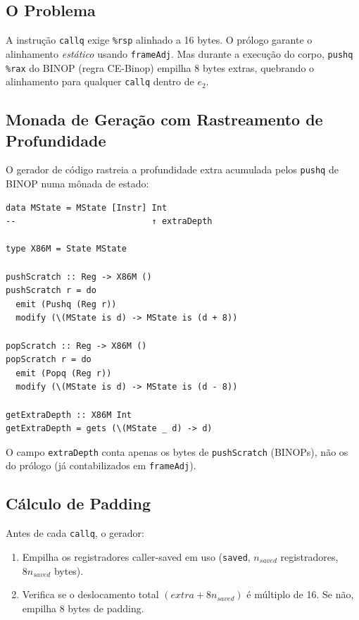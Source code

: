 \subsection{O Problema}

A instrução \texttt{callq} exige \texttt{\%rsp} alinhado a 16 bytes.
O prólogo garante o alinhamento \emph{estático} usando \texttt{frameAdj}.
Mas durante a execução do corpo, \texttt{pushq \%rax} do BINOP
(regra CE-Binop) empilha 8 bytes extras, quebrando o alinhamento para
qualquer \texttt{callq} dentro de $e_2$.

\subsection{Monada de Geração com Rastreamento de Profundidade}

O gerador de código rastreia a profundidade extra acumulada pelos
\texttt{pushq} de BINOP numa mônada de estado:

\begin{verbatim}
data MState = MState [Instr] Int
--                           ↑ extraDepth

type X86M = State MState

pushScratch :: Reg -> X86M ()
pushScratch r = do
  emit (Pushq (Reg r))
  modify (\(MState is d) -> MState is (d + 8))

popScratch :: Reg -> X86M ()
popScratch r = do
  emit (Popq (Reg r))
  modify (\(MState is d) -> MState is (d - 8))

getExtraDepth :: X86M Int
getExtraDepth = gets (\(MState _ d) -> d)
\end{verbatim}

O campo \texttt{extraDepth} conta apenas os bytes de \texttt{pushScratch}
(BINOPs), não os do prólogo (já contabilizados em \texttt{frameAdj}).

\subsection{Cálculo de Padding}

Antes de cada \texttt{callq}, o gerador:

\begin{enumerate}
  \item Empilha os registradores caller-saved em uso (\texttt{saved},
    $n_{\mathit{saved}}$ registradores, $8 n_{\mathit{saved}}$ bytes).
  \item Verifica se o deslocamento total $(\mathit{extra} + 8
    n_{\mathit{saved}})$
    é múltiplo de 16. Se não, empilha 8 bytes de padding.
\end{enumerate}


